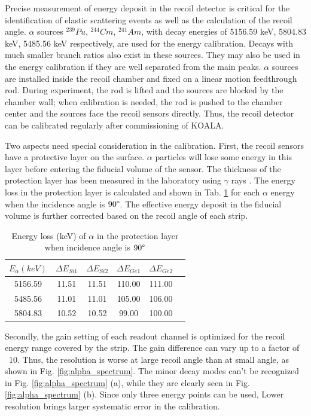 \documentclass[number,5p]{elsarticle}
\begin{document}
Precise measurement of energy deposit in the recoil detector is critical for the
identification of elastic scattering events as well as the calculation of the recoil angle.
\(\alpha\) sources \(^{239}Pu\), \(^{244}Cm\), \(^{241}Am\), with decay energies of 5156.59 keV, 5804.83 keV, 5485.56 keV \cite{nuclear_data} respectively, are used for the energy calibration.
Decays with much smaller branch ratios also exist in these sources. They may also be used in the energy calibration if they are well separated from the main peaks.
$\alpha$ sources are installed inside the recoil chamber and fixed on a linear motion feedthrough rod.
During experiment, the rod is lifted and the sources are blocked by the chamber wall;
when calibration is needed, the rod is pushed to the chamber center and the sources face the recoil sensors directly.
Thus, the recoil detector can be calibrated regularly after commissioning of KOALA.

Two aspects need special consideration in the calibration.
First, the recoil sensors have a protective layer on the surface. 
\(\alpha\) particles will lose some energy in this layer before entering the
fiducial volume of the sensor.
The thickness of the protection layer has been measured in the laboratory using \(\gamma\) rays \cite{recoil_article}.
The energy loss in the protection layer is calculated and shown in Tab. \ref{tab:dead_layer} for each $\alpha$ energy when the incidence angle is $90\degree$.
The effective energy deposit in the fiducial volume is further corrected based
on the recoil angle of each strip.

\begin{table}[htbp]
\label{tab:dead_layer}
\caption{Energy loss (keV) of $\alpha$ in the protection layer when incidence angle is $90\degree$}
\centering
\begin{tabular}{cccccc}
\hline
\(E_{\alpha} (keV)\) & \(\Delta E_{Si1}\) & \(\Delta E_{Si2}\) & \(\Delta E_{Ge1}\) & \(\Delta E_{Ge2}\) \\
\hline
5156.59 & 11.51 & 11.51 & 110.00 & 111.00 \\
5485.56 & 11.01 & 11.01 & 105.00 & 106.00 \\
5804.83 & 10.52 & 10.52 & 99.00  & 100.00 \\
\hline
\end{tabular}
\end{table}

Secondly, the gain setting of each readout channel is optimized for the recoil
energy range covered by the strip.
The gain difference can vary up to a factor of ~10.
Thus, the resolution is worse at large recoil angle than at small angle, as shown in Fig. \ref{fig:alpha_spectrum}.
The minor decay modes can't be recognized in Fig. \ref{fig:alpha_spectrum} (a), while they are clearly seen in Fig. \ref{fig:alpha_spectrum} (b).
Since only three energy points can be used, Lower resolution brings larger systematic error in the calibration.
\end{document}
